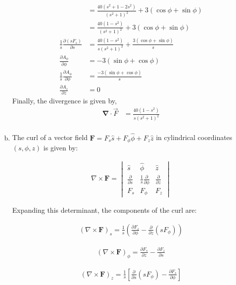 \begin{problem}{}{}
\begin{enumerate}[(a)]
\begin{align*}
        &=\frac{40\left(s^2+1 - 2s^2\right)}{\left(s^2+1\right)^2} + 3\left(\cos\phi+\sin\phi\right)\\
        &=\frac{40\left(1 - s^2\right)}{\left(s^2+1\right)^2} + 3\left(\cos\phi+\sin\phi\right)\\
       \frac{1}{s}\frac{\partial \left(s F_s\right)}{\partial s} &=  \frac{40\left(1 - s^2\right)}{s\left(s^2+1\right)^2} + \frac{3\left(\cos\phi+\sin\phi\right)}{s}\\
       \frac{\partial A_{\phi}}{\partial \phi} &= -3\left(\sin\phi+\cos\phi\right)\\
       \frac{1}{s}\frac{\partial A_{\phi}}{\partial \phi} &= \frac{-3\left(\sin\phi+\cos\phi\right)}{s}\\
       \frac{\partial A_z}{\partial z} &= 0
    \end{align*}
    Finally, the divergence is given by,
    \begin{align*}
        \mathbf{\nabla}\cdot \vec{F} &= \frac{40\left(1 - s^2\right)}{s\left(s^2+1\right)^2}\\
    \end{align*}
    \item
    The curl of a vector field \(\mathbf{F} = F_s \hat{s} + F_\phi \hat{\phi} + F_z \hat{z} \) in cylindrical coordinates \((s, \phi, z)\) is given by:

\begin{align*}
\nabla \times \mathbf{F} =
\begin{vmatrix}
\hat{s} & \hat{\phi} & \hat{z} \\
\frac{\partial}{\partial s} & \frac{1}{s} \frac{\partial}{\partial \phi} & \frac{\partial}{\partial z} \\
F_s & F_\phi & F_z
\end{vmatrix}
\end{align*}

Expanding this determinant, the components of the curl are:

\begin{align*}
(\nabla \times \mathbf{F})_s = \frac{1}{s} \left( \frac{\partial F_z}{\partial \phi} - \frac{\partial}{\partial z} (s F_\phi) \right)
\end{align*}

\begin{align*}
(\nabla \times \mathbf{F})_\phi = \frac{\partial F_s}{\partial z} - \frac{\partial F_z}{\partial s}
\end{align*}

\begin{align*}
(\nabla \times \mathbf{F})_z = \frac{1}{s} \left[ \frac{\partial}{\partial s} (s F_\phi) - \frac{\partial F_s}{\partial \phi} \right]
\end{align*}





\end{enumerate}
\end{problem}
